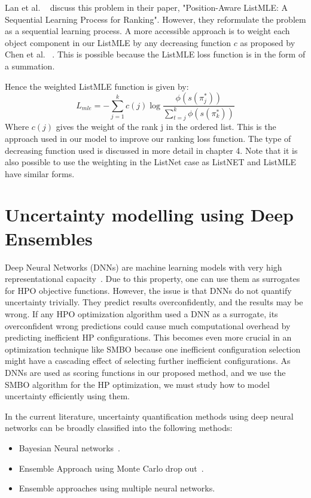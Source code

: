 \documentclass[12pt, twoside, ngerman]{report}
\begin{document}
Lan et al. ~\cite{positionawarerankinglistmle} discuss this problem in their paper,  "Position-Aware ListMLE: A Sequential Learning Process for Ranking".
However,  they reformulate the problem as a sequential learning process.
A more accessible approach is to weight each object component in our ListMLE by any decreasing function $c$ as proposed by Chen
 et al. ~\cite{TRLWO}.
This is possible because the ListMLE loss function is in the form of a summation.

Hence the weighted ListMLE function is given by:
\begin{equation}
L_{mle} = -  \sum\limits_{j=1}^{k} c(j) \log \frac{\phi(s(\pi^*_j))}{ \sum\limits_{t=j}^k \phi(s(\pi^*_k))}
\end{equation}
Where $c(j)$ gives the weight of the rank j in the ordered list.
This is the approach used in our model to improve our ranking loss function.
The type of decreasing function used is discussed in more detail in chapter 4.
Note that it is also possible to use the weighting in the ListNet case as ListNET and ListMLE have similar forms.

\section{Uncertainty modelling using Deep Ensembles}\label{sec:uncertaintyDeepEnsembles}

Deep Neural Networks (DNNs) are machine learning models with very high representational capacity~\cite{Goodfellow-et-al-2016}.
Due to this property,  one can use them as surrogates for HPO objective functions.
However, the issue is that DNNs do not quantify uncertainty trivially.
They predict results overconfidently, and the results may be wrong.
If any HPO optimization algorithm used a DNN as a surrogate,  its overconfident wrong predictions could cause much computational overhead by predicting inefficient HP configurations.
This becomes even more crucial in an optimization technique like SMBO because one inefficient configuration selection might have a cascading effect of selecting further inefficient configurations.
As DNNs are used as scoring functions in our proposed method, and we use the SMBO algorithm for the HP optimization, we must study how to model uncertainty efficiently using them.

In the current literature,  uncertainty quantification methods using deep neural networks can be broadly classified into the following methods:
\begin{itemize}
\item Bayesian Neural networks~\cite{Goan-2020}.
\item Ensemble Approach using Monte Carlo drop out~\cite{JMLR:v15:srivastava14a}.
\item Ensemble approaches using multiple neural networks.
\end{itemize}
\end{document}
